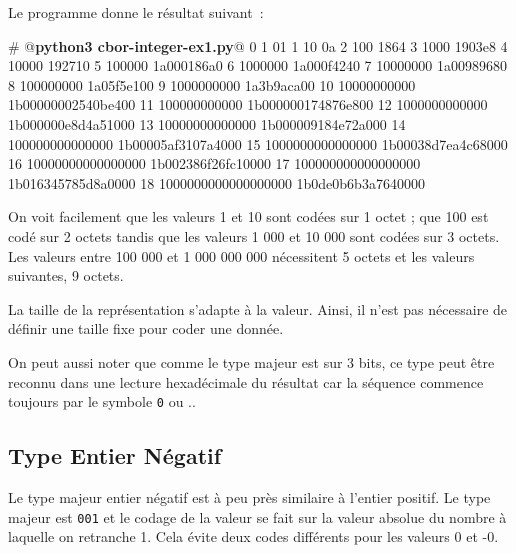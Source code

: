       \vspace{1em}

Le programme donne le résultat suivant~:

\begin{termc}[backgroundcolor=\color{palerod}, language=json, basicstyle=\ttfamily\small, escapechar=@]
 # @\textbf{python3 cbor-integer-ex1.py}@
  0                              1 01
  1                             10 0a
  2                            100 1864
  3                           1000 1903e8
  4                          10000 192710
  5                         100000 1a000186a0
  6                        1000000 1a000f4240
  7                       10000000 1a00989680
  8                      100000000 1a05f5e100
  9                     1000000000 1a3b9aca00
 10                    10000000000 1b00000002540be400
 11                   100000000000 1b000000174876e800
 12                  1000000000000 1b000000e8d4a51000
 13                 10000000000000 1b000009184e72a000
 14                100000000000000 1b00005af3107a4000
 15               1000000000000000 1b00038d7ea4c68000
 16              10000000000000000 1b002386f26fc10000
 17             100000000000000000 1b016345785d8a0000
 18            1000000000000000000 1b0de0b6b3a7640000
\end{termc}

       \vspace{1em}


On voit facilement que les valeurs 1 et 10 sont codées sur 1 octet ; que 100 est codé sur 2 octets tandis que les valeurs 1 000 et 10 000 sont codées sur 3 octets. Les valeurs entre 100 000 et 1 000 000 000 nécessitent 5 octets et les valeurs suivantes, 9 octets.

       \vspace{1em}


La taille de la représentation s'adapte à la valeur. Ainsi, il n'est pas nécessaire de définir une taille fixe pour coder une donnée.

On peut aussi noter que comme le type majeur est sur 3 bits, ce type peut être reconnu dans une lecture hexadécimale du résultat car la séquence commence toujours par le symbole \texttt{0} ou ..

\subsection{Type Entier Négatif}

Le type majeur entier négatif est à peu près similaire à l'entier positif. Le type majeur est \texttt{001} et le codage de la valeur se fait sur la valeur absolue du nombre à laquelle on retranche 1. Cela évite deux codes différents pour les valeurs 0 et -0.

